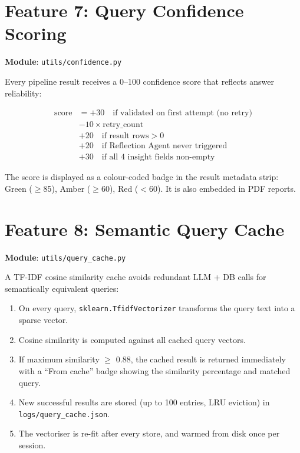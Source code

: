 \documentclass[12pt,a4paper]{report}
\begin{document}
\section{Feature 7: Query Confidence Scoring}

\textbf{Module}: \texttt{utils/confidence.py}

Every pipeline result receives a 0--100 confidence score that reflects answer reliability:

\begin{align*}
  \text{score} &= +30 \quad\text{if validated on first attempt (no retry)} \\
               &- 10 \times \text{retry\_count} \\
               &+ 20 \quad\text{if result rows} > 0 \\
               &+ 20 \quad\text{if Reflection Agent never triggered} \\
               &+ 30 \quad\text{if all 4 insight fields non-empty}
\end{align*}

The score is displayed as a colour-coded badge in the result metadata strip:
Green ($\geq$85), Amber ($\geq$60), Red ($<$60). It is also embedded in PDF reports.

\section{Feature 8: Semantic Query Cache}

\textbf{Module}: \texttt{utils/query\_cache.py}

A TF-IDF cosine similarity cache avoids redundant LLM + DB calls for semantically equivalent
queries:

\begin{enumerate}
  \item On every query, \texttt{sklearn.TfidfVectorizer} transforms the query text into a
        sparse vector.
  \item Cosine similarity is computed against all cached query vectors.
  \item If maximum similarity $\geq$ 0.88, the cached result is returned immediately with
        a ``From cache'' badge showing the similarity percentage and matched query.
  \item New successful results are stored (up to 100 entries, LRU eviction) in
        \texttt{logs/query\_cache.json}.
  \item The vectoriser is re-fit after every store, and warmed from disk once per session.
\end{enumerate}
\end{document}
